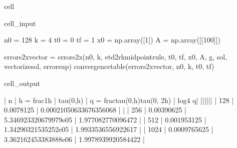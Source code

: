 \documentclass[letterpaper,10pt,english]{jupyterBook}
\begin{document}
\begin{sphinxuseclass}{cell}\begin{sphinxVerbatimInput}

\begin{sphinxuseclass}{cell_input}
\begin{sphinxVerbatim}[commandchars=\\\{\}]
n0 = 128
k = 4
t0 = 0
tf = 1
x0 = np.array([1])
A = np.array([[100]])

errors\PYGZus{}2x\PYGZus{}vector = errors\PYGZus{}2x(n0, k, etd2rk\PYGZus{}midpoint\PYGZus{}rule, t0, tf, x0, A, g, sol, vectorize\PYGZus{}sol, error\PYGZus{}sup)
convergence\PYGZus{}table(errors\PYGZus{}2x\PYGZus{}vector, n0, k, t0, tf)
\end{sphinxVerbatim}

\end{sphinxuseclass}\end{sphinxVerbatimInput}
\begin{sphinxVerbatimOutput}

\begin{sphinxuseclass}{cell_output}
\begin{sphinxVerbatim}[commandchars=\\\{\}]
| n | h = \PYGZdl{}\PYGZbs{}frac\PYGZob{}1\PYGZcb{}\PYGZob{}h\PYGZcb{}\PYGZdl{} | \PYGZdl{}\PYGZbs{}tau(0,h)\PYGZdl{} | q = \PYGZdl{}\PYGZbs{}frac\PYGZob{}tau(0,h)\PYGZcb{}\PYGZob{}tau(0, 2h)\PYGZcb{}\PYGZdl{} | \PYGZdl{}log\PYGZus{}4 \PYGZca{}q\PYGZdl{}|
|\PYGZhy{}\PYGZhy{}\PYGZhy{}|\PYGZhy{}\PYGZhy{}\PYGZhy{}\PYGZhy{}\PYGZhy{}\PYGZhy{}\PYGZhy{}\PYGZhy{}\PYGZhy{}\PYGZhy{}\PYGZhy{}\PYGZhy{}\PYGZhy{}\PYGZhy{}\PYGZhy{}\PYGZhy{}\PYGZhy{}|\PYGZhy{}\PYGZhy{}\PYGZhy{}\PYGZhy{}\PYGZhy{}\PYGZhy{}\PYGZhy{}\PYGZhy{}\PYGZhy{}\PYGZhy{}\PYGZhy{}|\PYGZhy{}\PYGZhy{}\PYGZhy{}\PYGZhy{}\PYGZhy{}\PYGZhy{}\PYGZhy{}\PYGZhy{}\PYGZhy{}\PYGZhy{}\PYGZhy{}\PYGZhy{}\PYGZhy{}\PYGZhy{}\PYGZhy{}\PYGZhy{}\PYGZhy{}\PYGZhy{}\PYGZhy{}\PYGZhy{}\PYGZhy{}\PYGZhy{}\PYGZhy{}\PYGZhy{}\PYGZhy{}\PYGZhy{}\PYGZhy{}\PYGZhy{}\PYGZhy{}\PYGZhy{}\PYGZhy{}\PYGZhy{}\PYGZhy{}|\PYGZhy{}\PYGZhy{}\PYGZhy{}\PYGZhy{}\PYGZhy{}\PYGZhy{}\PYGZhy{}|
 | 128 | 0.0078125 | 0.00021050633676356068 | \PYGZhy{} | 
 | 256 | 0.00390625 | 5.346923320679979e\PYGZhy{}05 | 1.977082770096472 | 
 | 512 | 0.001953125 | 1.34290321535252e\PYGZhy{}05 | 1.9933536556922617 | 
 | 1024 | 0.0009765625 | 3.362162453383888e\PYGZhy{}06 | 1.9978939920584422 | 
\end{sphinxVerbatim}

\end{sphinxuseclass}\end{sphinxVerbatimOutput}

\end{sphinxuseclass}
\end{document}

